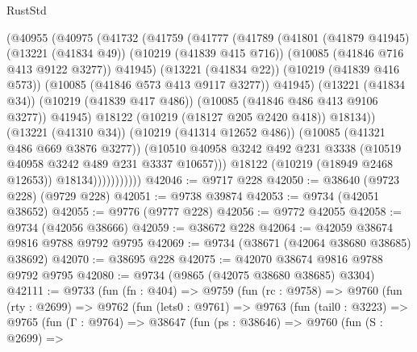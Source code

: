 \begin{lexlean}{RustStd}
\begin{coremodule}
                        (@40955
                          (@40975
                            (@41732
                              (@41759
                                (@41777
                                  (@41789
                                    (@41801
                                      (@41879 @41945)
                                      (@13221 (@41834 @49))
                                      (@10219 (@41839 @415 @716))
                                      (@10085 (@41846 @716 @413 @9122 @3277))
                                      @41945)
                                    (@13221 (@41834 @22))
                                    (@10219 (@41839 @416 @573))
                                    (@10085 (@41846 @573 @413 @9117 @3277))
                                    @41945)
                                  (@13221 (@41834 @34))
                                  (@10219 (@41839 @417 @486))
                                  (@10085 (@41846 @486 @413 @9106 @3277))
                                  @41945)
                                @18122
                                (@10219 (@18127 @205 @2420 @418))
                                @18134))
                            (@13221 (@41310 @34))
                            (@10219 (@41314 @12652 @486))
                            (@10085 (@41321 @486 @669 @3876 @3277))
                            (@10510
                              @40958
                              @3242
                              @492
                              @231
                              @3338
                              (@10519 @40958 @3242 @489 @231 @3337 @10657)))
                          @18122
                          (@10219 (@18949 @2468 @12653))
                          @18134)))))))))))
@42046 := @9717 @228
@42050 := @38640 (@9723 @228) (@9729 @228)
@42051 := @9738 @39874
@42053 := @9734 (@42051 @38652)
@42055 := @9776 (@9777 @228)
@42056 := @9772 @42055
@42058 := @9734 (@42056 @38666)
@42059 := @38672 @228
@42064 := @42059 @38674 @9816 @9788 @9792 @9795
@42069 := @9734 (@38671 (@42064 @38680 @38685) @38692)
@42070 := @38695 @228
@42075 := @42070 @38674 @9816 @9788 @9792 @9795
@42080 := @9734 (@9865 (@42075 @38680 @38685) @3304)
@42111 := @9733
    (fun (fn : @404) =>
    @9759
      (fun (rc : @9758) =>
      @9760
        (fun (rty : @2699) =>
        @9762
          (fun (lets0 : @9761) =>
          @9763
            (fun (tail0 : @3223) =>
            @9765
              (fun (Γ : @9764) =>
              @38647
                (fun (ps : @38646) =>
                @9760
                  (fun (S : @2699) =>

\end{coremodule}
\end{lexlean}
